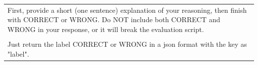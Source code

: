 \documentclass[11pt]{article}
\begin{document}
\begin{table}[!b]
\begin{tcolorbox}
\begin{tabularx}{\textwidth}{X}
First, provide a short (one sentence) explanation of your reasoning, then finish with CORRECT or WRONG.
Do NOT include both CORRECT and WRONG in your response, or it will break the evaluation script.\\\\

Just return the label CORRECT or WRONG in a json format with the key as "label".
\end{tabularx}
\end{tcolorbox}
\end{table}
\end{document}
